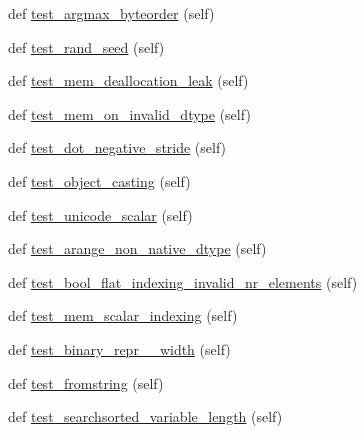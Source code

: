 \begin{DoxyCompactItemize}
\item 
def \hyperlink{classnumpy_1_1core_1_1tests_1_1test__regression_1_1TestRegression_a669d26b65d491e830bf7eeeba5507def}{test\+\_\+argmax\+\_\+byteorder} (self)
\item 
def \hyperlink{classnumpy_1_1core_1_1tests_1_1test__regression_1_1TestRegression_a50efd7bd5f52db6440b1683f8d62917e}{test\+\_\+rand\+\_\+seed} (self)
\item 
def \hyperlink{classnumpy_1_1core_1_1tests_1_1test__regression_1_1TestRegression_afeeb06b3e9da1b835a1d9e014fe3d3ec}{test\+\_\+mem\+\_\+deallocation\+\_\+leak} (self)
\item 
def \hyperlink{classnumpy_1_1core_1_1tests_1_1test__regression_1_1TestRegression_a242841f62d526cf18e7557c06c6304f7}{test\+\_\+mem\+\_\+on\+\_\+invalid\+\_\+dtype} (self)
\item 
def \hyperlink{classnumpy_1_1core_1_1tests_1_1test__regression_1_1TestRegression_af237cad697789e28fd6e5ce7141ff12a}{test\+\_\+dot\+\_\+negative\+\_\+stride} (self)
\item 
def \hyperlink{classnumpy_1_1core_1_1tests_1_1test__regression_1_1TestRegression_ab0d70dd229367946bfe52fc201dc9aa5}{test\+\_\+object\+\_\+casting} (self)
\item 
def \hyperlink{classnumpy_1_1core_1_1tests_1_1test__regression_1_1TestRegression_a25c467a4e5075ba06b107cac89d35810}{test\+\_\+unicode\+\_\+scalar} (self)
\item 
def \hyperlink{classnumpy_1_1core_1_1tests_1_1test__regression_1_1TestRegression_adf2eef2bb4c7fa92549c3d86204f2503}{test\+\_\+arange\+\_\+non\+\_\+native\+\_\+dtype} (self)
\item 
def \hyperlink{classnumpy_1_1core_1_1tests_1_1test__regression_1_1TestRegression_a6aa5d04c3a4a21589a8149ac11876945}{test\+\_\+bool\+\_\+flat\+\_\+indexing\+\_\+invalid\+\_\+nr\+\_\+elements} (self)
\item 
def \hyperlink{classnumpy_1_1core_1_1tests_1_1test__regression_1_1TestRegression_ae45ee9c6d767adac4ae3e465cbe8a47e}{test\+\_\+mem\+\_\+scalar\+\_\+indexing} (self)
\item 
def \hyperlink{classnumpy_1_1core_1_1tests_1_1test__regression_1_1TestRegression_afebf63ba3598847ca6bcfddd151779c6}{test\+\_\+binary\+\_\+repr\+\_\+\_\+width} (self)
\item 
def \hyperlink{classnumpy_1_1core_1_1tests_1_1test__regression_1_1TestRegression_ae63cf2c8055629ae50fdb8527cd9862d}{test\+\_\+fromstring} (self)
\item 
def \hyperlink{classnumpy_1_1core_1_1tests_1_1test__regression_1_1TestRegression_a31b37525fa32238e331a28d7a2b6dd6a}{test\+\_\+searchsorted\+\_\+variable\+\_\+length} (self)

\end{DoxyCompactItemize}
